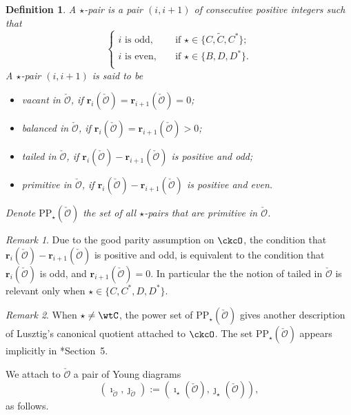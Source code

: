\documentclass[11pt,a4paper]{amsart}
\newcommand{\CO}{{\mathcal {O}}}
\numberwithin{equation}{section}
\newtheorem{defn}[thm]{Definition}
\theoremstyle{remark}
\newtheorem*{remark}{Remark}
\begin{document}
\begin{defn}
 A $\star$-pair is a pair  $(i,i+1)$ of consecutive positive integers such that
\[
   \left\{
     \begin{array}{ll}
      i\textrm{ is odd}, \quad &\textrm{if $\star\in\{C, \widetilde{C}, C^*\}$};  \\
      i \textrm{ is even}, \quad &\textrm{if $\star\in\{B, D, D^*\}$}. \\
       \end{array}
   \right.
\]
A $\star$-pair   $(i,i+1)$ is said to be
\begin{itemize}
\item
vacant in $\check \CO$, if $\mathbf r_i(\check \CO)=\mathbf r_{i+1}(\check \CO)=0$;
\item
balanced in $\check \CO$,  if  $\mathbf r_i(\check \CO)=\mathbf r_{i+1}(\check \CO)>0$;
\item
tailed in $\check \CO$,  if  $\mathbf r_i(\check \CO)-\mathbf r_{i+1}(\check \CO)$ is positive and odd;
\item
primitive in $\check \CO$, if    $\mathbf r_i(\check \CO)-\mathbf r_{i+1}(\check \CO)$ is positive and even.
\end{itemize}
Denote $\mathrm{PP}_\star(\check \CO)$ the  set of all $\star$-pairs that are primitive in $\check \CO$.
\end{defn}

\begin{remark} Due to the good parity assumption on $\ckcO$, the condition that   
$\mathbf r_i(\check \CO)-\mathbf r_{i+1}(\check \CO)$ is positive and odd, is equivalent to the condition that $\mathbf r_i(\check \CO)$ is odd, and $\mathbf r_{i+1}(\check \CO)=0$. In particular the the notion of tailed in $\check \CO$ is relevant only when $\star\in\{C,C^*,D,D^*\}$. 
\end{remark}

\begin{remark} When $\star\neq \wtC$, %
the power set of $\mathrm{PP}_\star(\check \CO)$ gives another description of Lusztig's canonical
  quotient attached to $\ckcO$. The set $\mathrm{PP}_{\star}(\check\CO)$ appears implicitly in
\cite{So}*{Section~5}.
\end{remark}

We attach to $\check \CO$ a pair of Young diagrams
\begin{equation}\label{ijO}
(\imath_{\check \CO}, \jmath_{\check \CO}):=(\imath_\star(\check \CO), \jmath_\star(\check \CO)),
\end{equation}
 as follows.
\end{document}
